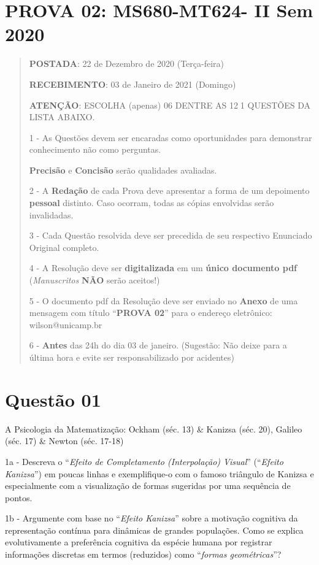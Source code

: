 \section*{PROVA 02: MS680-MT624- II Sem 2020}

\begin{quote}
\textbf{POSTADA}: 22 de Dezembro de 2020 (Terça-feira)

\textbf{RECEBIMENTO}: 03 de Janeiro de 2021 (Domingo)

\textbf{ATENÇÃO}: ESCOLHA (apenas) 06 DENTRE AS 121 QUESTÕES DA LISTA ABAIXO.

1 - As Questões devem ser encaradas como oportunidades para demonstrar conhecimento não como perguntas.

\textbf{Precisão} e \textbf{Concisão} serão qualidades avaliadas.

2 - A \textbf{Redação} de cada Prova deve apresentar a forma de um depoimento \textbf{pessoal} distinto. Caso ocorram, todas as cópias envolvidas serão invalidadas.

3 - Cada Questão resolvida deve ser precedida de seu respectivo Enunciado Original completo.

4 - A Resolução deve ser \textbf{digitalizada} em um \textbf{único documento pdf} (\textit{Manuscritos} \textbf{NÃO} serão aceitos!)

5 - O documento pdf da Resolução deve ser enviado no \textbf{Anexo} de uma mensagem com título ``\textbf{PROVA 02}'' para o endereço eletrônico: wilson@unicamp.br

6 - \textbf{Antes} das 24h do dia 03 de janeiro. (Sugestão: Não deixe para a última hora e evite ser responsabilizado por acidentes)
\end{quote}


\section*{Questão 01}


A Psicologia da Matematização: Ockham (séc. 13) \& Kanizsa (séc. 20), Galileo (séc. 17) \& Newton (séc. 17-18)

    1a - Descreva o ``\textit{Efeito de Completamento (Interpolação) Visual}'' (``\textit{Efeito Kanizsa}'') em poucas linhas e exemplifique-o com o famoso triângulo de Kanizsa e especialmente com a visualização de formas sugeridas por uma sequência de pontos.

    1b - Argumente com base no ``\textit{Efeito Kanizsa}'' sobre a motivação cognitiva da representação contínua para dinâmicas de grandes populações. Como se explica evolutivamente a preferência cognitiva da espécie humana por registrar informações discretas em termos (reduzidos) como ``\textit{formas geométricas}''?

